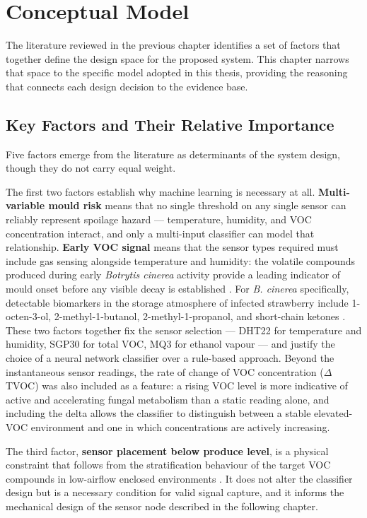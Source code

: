 \chapter{Conceptual Model}\label{chap:conceptual_model}

The literature reviewed in the previous chapter identifies a set of factors that together define the design space for the proposed system. This chapter narrows that space to the specific model adopted in this thesis, providing the reasoning that connects each design decision to the evidence base.

\section{Key Factors and Their Relative Importance}

Five factors emerge from the literature as determinants of the system design, though they do not carry equal weight.

The first two factors establish why machine learning is necessary at all. \textbf{Multi-variable mould risk} means that no single threshold on any single sensor can reliably represent spoilage hazard --- temperature, humidity, and VOC concentration interact, and only a multi-input classifier can model that relationship. \textbf{Early VOC signal} means that the sensor types required must include gas sensing alongside temperature and humidity: the volatile compounds produced during early \textit{Botrytis cinerea} activity provide a leading indicator of mould onset before any visible decay is established \cite{Yang2025, Ma2023}. For \textit{B. cinerea} specifically, detectable biomarkers in the storage atmosphere of infected strawberry include 1-octen-3-ol, 2-methyl-1-butanol, 2-methyl-1-propanol, and short-chain ketones \cite{Vandendriessche2012}. These two factors together fix the sensor selection --- DHT22 for temperature and humidity, SGP30 for total VOC, MQ3 for ethanol vapour --- and justify the choice of a neural network classifier over a rule-based approach. Beyond the instantaneous sensor readings, the rate of change of VOC concentration ($\Delta$TVOC) was also included as a feature: a rising VOC level is more indicative of active and accelerating fungal metabolism than a static reading alone, and including the delta allows the classifier to distinguish between a stable elevated-VOC environment and one in which concentrations are actively increasing.

The third factor, \textbf{sensor placement below produce level}, is a physical constraint that follows from the stratification behaviour of the target VOC compounds in low-airflow enclosed environments \cite{Zhang2026}. It does not alter the classifier design but is a necessary condition for valid signal capture, and it informs the mechanical design of the sensor node described in the following chapter.

